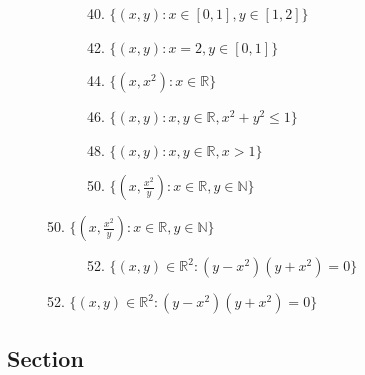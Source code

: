 \documentclass{article}
\begin{document}
\clearpage
\begin{figure}
    \centering
    \begin{subfigure}[b]{0.49\textwidth}
        \centering
        \caption*{40. $\{(x,y):x \in [0,1], y\in [1,2] \}$}
        \resizebox{1\linewidth}{!}{}
    \end{subfigure}
    \hfill
    \begin{subfigure}[b]{0.49\textwidth}
        \centering
        \caption*{42. $\{(x,y):x = 2,y \in [0,1] \}$}
        \resizebox{1\linewidth}{!}{}
    \end{subfigure}
    \hfill
    \begin{subfigure}[b]{0.49\textwidth}
        \centering
        \caption*{44. $\{(x,x^2):x \in \mathbb{R} \} $}
        \resizebox{1\linewidth}{!}{}
    \end{subfigure}
    \hfill
    \begin{subfigure}[b]{0.49\textwidth}
        \centering
        \caption*{46. $\{(x,y):x,y \in \mathbb{R},x^2+y^2\leq1 \}$}
        \resizebox{1\linewidth}{!}{}
    \end{subfigure}
    \hfill
    \begin{subfigure}[b]{0.49\textwidth}
        \centering
        \caption*{48. $\{(x,y):x,y \in \mathbb{R},x > 1 \}$}
        \resizebox{1\linewidth}{!}{}
    \end{subfigure}
    \hfill
    \begin{subfigure}[b]{0.49\textwidth}
        \centering
        \caption*{50. $\{(x,\frac{x^2}{y}):x \in \mathbb{R},y \in \mathbb{N} \}$}
        \resizebox{1\linewidth}{!}{}
    \end{subfigure}
\end{figure}
\clearpage
\begin{figure}
    \centering
    \begin{subfigure}[b]{0.49\textwidth}
        \centering
        \caption*{52. $\{(x,y) \in \mathbb{R}^2: (y-x^2)(y+x^2) =0 \}$}
        \resizebox{1\linewidth}{!}{}
    \end{subfigure}
\end{figure}

\subsection{Section}
\end{document}
